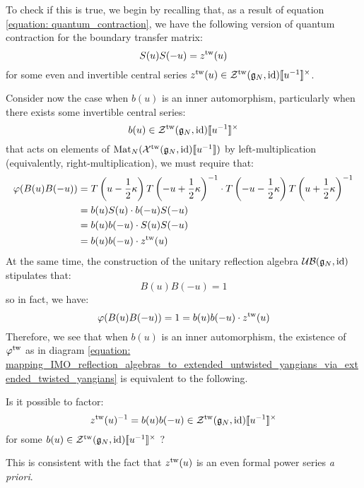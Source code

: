             To check if this is true, we begin by recalling that, as a result of equation \eqref{equation: quantum_contraction}, we have the following version of quantum contraction for the boundary transfer matrix:
                $$S(u) S(-u) = z^{\mathrm{tw}}(u)$$
            for some even and invertible central series $z^{\tw}(u) \in \calZ^{\tw}(\g_N, \id)[\![u^{-1}]\!]^{\x}$.
            
            Consider now the case when $b(u)$ is an inner automorphism, particularly when there exists some invertible central series:
                $$b(u) \in \calZ^{\tw}(\g_N, \id)[\![u^{-1}]\!]^{\x}$$
            that acts on elements of $\mathrm{Mat}_N(\mathcal{X}^{\mathrm{tw}}(\mathfrak{g}_N, \mathrm{id})[\![u^{-1}]\!])$ by left-multiplication (equivalently, right-multiplication), we must require that:
                $$
                    \begin{aligned}
                        \varphi( B(u) B(-u) ) & = T\left(u - \frac12 \kappa\right) T\left(-u + \frac12 \kappa\right)^{-1} \cdot T\left(-u - \frac12 \kappa\right) T\left(u + \frac12 \kappa\right)^{-1}
                        \\
                        & = b(u) S(u) \cdot b(-u) S(-u)
                        \\
                        & = b(u) b(-u) \cdot S(u) S(-u)
                        \\
                        & = b(u) b(-u) \cdot z^{\mathrm{tw}}(u)
                    \end{aligned}
                $$
            At the same time, the construction of the unitary reflection algebra $\mathcal{UB}(\mathfrak{g}_N, \mathrm{id})$ stipulates that:
                $$B(u) B(-u) = 1$$
            so in fact, we have:
                $$\varphi( B(u) B(-u) ) = 1 = b(u) b(-u) \cdot z^{\mathrm{tw}}(u)$$
            Therefore, we see that when $b(u)$ is an inner automorphism, the existence of $\varphi^{\mathrm{tw}}$ as in diagram \eqref{equation: mapping_IMO_reflection_algebras_to_extended_untwisted_yangians_via_extended_twisted_yangians} is equivalent to the following.
            \begin{question} \label{question: boundary_quantum_contraction_factorisation}
                Is it possible to factor:
                    \begin{equation} \label{equation: boundary_quantum_contraction_factorisation}
                        z^{\tw}(u)^{-1} = b(u) b(-u) \in \calZ^{\tw}(\g_N, \id)[\![u^{-1}]\!]^{\x}
                    \end{equation}
                for some $b(u) \in \calZ^{\tw}(\g_N, \id)[\![u^{-1}]\!]^{\x}$ ?
            \end{question}
            \begin{remark}
                This is consistent with the fact that $z^{\mathrm{tw}}(u)$ is an even formal power series \textit{a priori}.
            \end{remark}
            
